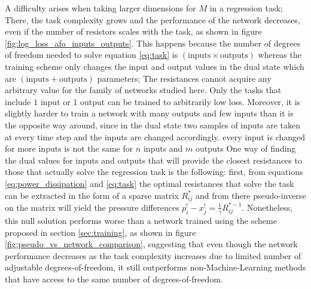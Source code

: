 \documentclass[%
 reprint,
 amsmath,amssymb,
 aps,
]{revtex4-2}
\begin{document}
    A difficulty arises when taking larger dimensions for $M$ in a regression task; There, the task complexity grows and the performance of the network decreases, even if the number of resistors scales with the task, as shown in figure \ref{fig:log_loss_afo_inputs_outputs}. This happens because the number of degrees of freedom needed to solve equation \ref{eq:task} is $\left(\text{inputs}\times\text{outputs}\right)$ whereas the training scheme only changes the input and output values in the dual state which are $\left(\text{inputs}+\text{outputs}\right)$ parameters; The resistances cannot acquire any arbitrary value for the family of networks studied here. Only the tasks that include $1$ input or $1$ output can be trained to arbitrarily low loss. Moreover, it is slightly harder to train a network with many outputs and few inputs than it is the opposite way around, since in the dual state two samples of inputs are taken at every time step and the inputs are changed accordingly. every input is changed  for more inputs is not the same for $n$ inputs and $m$ outputs One way of finding the dual values for inputs and outputs that will provide the closest resistances to those that actually solve the regression task is the following: first, from equations \ref{eq:power_dissipation} and \ref{eq:task} the optimal resistances that solve the task can be extracted in the form of a sparse matrix $R_{ij}^*$ and from there pseudo-inverse on the matrix will yield the pressure differences $p_i^!-x_j^!=\frac{1}{\gamma}R_{ij}^{*-1}$. Nonetheless, this null solution performs worse than a network trained using the scheme proposed in section \ref{sec:training}, as shown in figure \ref{fig:pseudo_vs_network_comparison}, suggesting that even though the network performance decreases as the task complexity increases due to limited number of adjustable degrees-of-freedom, it still outperforms non-Machine-Learning methods that have access to the same number of degrees-of-freedom.
\end{document}
